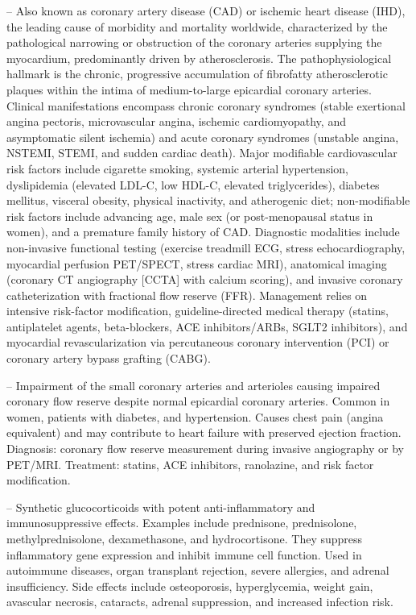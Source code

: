 -- Also known as coronary artery disease (CAD) or ischemic heart disease (IHD), the leading cause of morbidity and mortality worldwide, characterized by the pathological narrowing or obstruction of the coronary arteries supplying the myocardium, predominantly driven by atherosclerosis. The pathophysiological hallmark is the chronic, progressive accumulation of fibrofatty atherosclerotic plaques within the intima of medium-to-large epicardial coronary arteries. Clinical manifestations encompass chronic coronary syndromes (stable exertional angina pectoris, microvascular angina, ischemic cardiomyopathy, and asymptomatic silent ischemia) and acute coronary syndromes (unstable angina, NSTEMI, STEMI, and sudden cardiac death). Major modifiable cardiovascular risk factors include cigarette smoking, systemic arterial hypertension, dyslipidemia (elevated LDL-C, low HDL-C, elevated triglycerides), diabetes mellitus, visceral obesity, physical inactivity, and atherogenic diet; non-modifiable risk factors include advancing age, male sex (or post-menopausal status in women), and a premature family history of CAD. Diagnostic modalities include non-invasive functional testing (exercise treadmill ECG, stress echocardiography, myocardial perfusion PET/SPECT, stress cardiac MRI), anatomical imaging (coronary CT angiography [CCTA] with calcium scoring), and invasive coronary catheterization with fractional flow reserve (FFR). Management relies on intensive risk-factor modification, guideline-directed medical therapy (statins, antiplatelet agents, beta-blockers, ACE inhibitors/ARBs, SGLT2 inhibitors), and myocardial revascularization via percutaneous coronary intervention (PCI) or coronary artery bypass grafting (CABG).

-- Impairment of the small coronary arteries and arterioles causing impaired coronary flow reserve despite normal epicardial coronary arteries. Common in women, patients with diabetes, and hypertension. Causes chest pain (angina equivalent) and may contribute to heart failure with preserved ejection fraction. Diagnosis: coronary flow reserve measurement during invasive angiography or by PET/MRI. Treatment: statins, ACE inhibitors, ranolazine, and risk factor modification.

-- Synthetic glucocorticoids with potent anti-inflammatory and immunosuppressive effects. Examples include prednisone, prednisolone, methylprednisolone, dexamethasone, and hydrocortisone. They suppress inflammatory gene expression and inhibit immune cell function. Used in autoimmune diseases, organ transplant rejection, severe allergies, and adrenal insufficiency. Side effects include osteoporosis, hyperglycemia, weight gain, avascular necrosis, cataracts, adrenal suppression, and increased infection risk.

